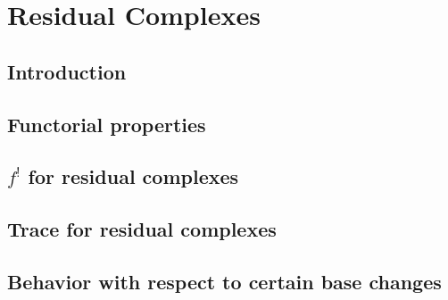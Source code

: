 
\chapter{Residual Complexes}
\section{Introduction}
\section{Functorial properties}
\section{$f^!$ for residual complexes}
\section{Trace for residual complexes}
\section{Behavior with respect to certain base changes}